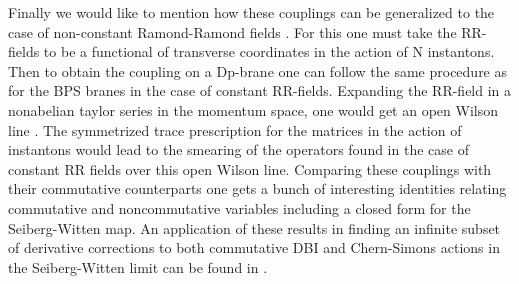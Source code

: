 \documentclass[a4paper,a4paper]{amsproc}
\theoremstyle{definition}
\theoremstyle{remark}
\numberwithin{equation}{section}
\begin{document}
Finally we would like to mention how these couplings can be
generalized to the case of non-constant Ramond-Ramond fields
\cite{okawao, smnvstwo, micheliutwo}. For this one must take the
RR-fields to be a functional of transverse coordinates in
the action of N instantons. Then to obtain the coupling on a Dp-brane
one can follow the same procedure as for the BPS branes in the case of
constant RR-fields. Expanding the RR-field in a
nonabelian taylor series in the momentum space, one would get an open
Wilson line \cite{liu, dastrivedi}. The symmetrized trace prescription
for the matrices in the action of instantons would lead to the
smearing of the operators found in the case of constant RR fields over
this open Wilson line. Comparing these couplings with their
commutative counterparts one gets a bunch of interesting identities
relating commutative and noncommutative variables including a closed
form for the Seiberg-Witten map. An application of these results in
finding an infinite subset of derivative corrections to both
commutative DBI and Chern-Simons actions in the Seiberg-Witten limit
can be found in \cite{sdsmnvs}.

\newpage
\end{document}
